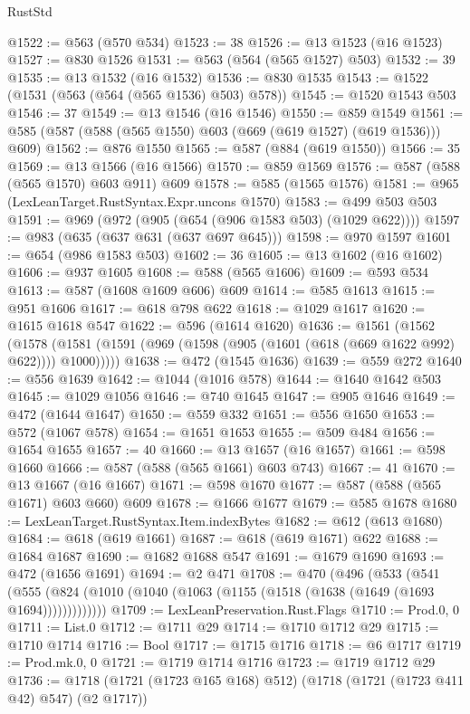 \begin{lexlean}{RustStd}
\begin{coremodule}
@1522 := @563 (@570 @534)
@1523 := 38
@1526 := @13 @1523 (@16 @1523)
@1527 := @830 @1526
@1531 := @563 (@564 (@565 @1527) @503)
@1532 := 39
@1535 := @13 @1532 (@16 @1532)
@1536 := @830 @1535
@1543 := @1522 (@1531 (@563 (@564 (@565 @1536) @503) @578))
@1545 := @1520 @1543 @503
@1546 := 37
@1549 := @13 @1546 (@16 @1546)
@1550 := @859 @1549
@1561 := @585 (@587 (@588 (@565 @1550) @603 (@669 (@619 @1527) (@619 @1536))) @609)
@1562 := @876 @1550
@1565 := @587 (@884 (@619 @1550))
@1566 := 35
@1569 := @13 @1566 (@16 @1566)
@1570 := @859 @1569
@1576 := @587 (@588 (@565 @1570) @603 @911) @609
@1578 := @585 (@1565 @1576)
@1581 := @965 (LexLeanTarget.RustSyntax.Expr.uncons @1570)
@1583 := @499 @503 @503
@1591 := @969 (@972 (@905 (@654 (@906 @1583 @503) (@1029 @622))))
@1597 := @983 (@635 (@637 @631 (@637 @697 @645)))
@1598 := @970 @1597
@1601 := @654 (@986 @1583 @503)
@1602 := 36
@1605 := @13 @1602 (@16 @1602)
@1606 := @937 @1605
@1608 := @588 (@565 @1606)
@1609 := @593 @534
@1613 := @587 (@1608 @1609 @606) @609
@1614 := @585 @1613
@1615 := @951 @1606
@1617 := @618 @798 @622
@1618 := @1029 @1617
@1620 := @1615 @1618 @547
@1622 := @596 (@1614 @1620)
@1636 := @1561
    (@1562
      (@1578 (@1581 (@1591 (@969 (@1598 (@905 (@1601 (@618 (@669 @1622 @992) @622)))) @1000)))))
@1638 := @472 (@1545 @1636)
@1639 := @559 @272
@1640 := @556 @1639
@1642 := @1044 (@1016 @578)
@1644 := @1640 @1642 @503
@1645 := @1029 @1056
@1646 := @740 @1645
@1647 := @905 @1646
@1649 := @472 (@1644 @1647)
@1650 := @559 @332
@1651 := @556 @1650
@1653 := @572 (@1067 @578)
@1654 := @1651 @1653
@1655 := @509 @484
@1656 := @1654 @1655
@1657 := 40
@1660 := @13 @1657 (@16 @1657)
@1661 := @598 @1660
@1666 := @587 (@588 (@565 @1661) @603 @743)
@1667 := 41
@1670 := @13 @1667 (@16 @1667)
@1671 := @598 @1670
@1677 := @587 (@588 (@565 @1671) @603 @660) @609
@1678 := @1666 @1677
@1679 := @585 @1678
@1680 := LexLeanTarget.RustSyntax.Item.indexBytes
@1682 := @612 (@613 @1680)
@1684 := @618 (@619 @1661)
@1687 := @618 (@619 @1671) @622
@1688 := @1684 @1687
@1690 := @1682 @1688 @547
@1691 := @1679 @1690
@1693 := @472 (@1656 @1691)
@1694 := @2 @471
@1708 := @470
    (@496
      (@533
        (@541 (@555 (@824 (@1010 (@1040 (@1063 (@1155 (@1518 (@1638 (@1649 (@1693 @1694)))))))))))))
@1709 := LexLeanPreservation.Rust.Flags
@1710 := Prod.{0, 0}
@1711 := List.{0}
@1712 := @1711 @29
@1714 := @1710 @1712 @29
@1715 := @1710 @1714
@1716 := Bool
@1717 := @1715 @1716
@1718 := @6 @1717
@1719 := Prod.mk.{0, 0}
@1721 := @1719 @1714 @1716
@1723 := @1719 @1712 @29
@1736 := @1718 (@1721 (@1723 @165 @168) @512) (@1718 (@1721 (@1723 @411 @42) @547) (@2 @1717))

\end{coremodule}
\end{lexlean}
